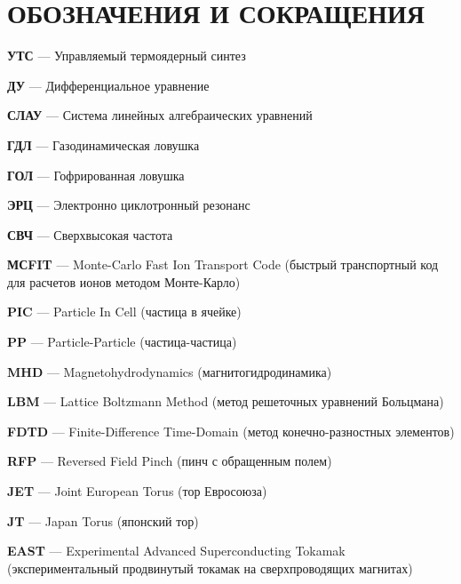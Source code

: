 \chapter*{ОБОЗНАЧЕНИЯ  И СОКРАЩЕНИЯ}             %

\textbf{УТС} --- Управляемый термоядерный синтез

\textbf{ДУ} --- Дифференциальное уравнение

\textbf{СЛАУ} --- Система линейных алгебраических уравнений

\textbf{ГДЛ} --- Газодинамическая ловушка

\textbf{ГОЛ} --- Гофрированная ловушка

\textbf{ЭРЦ} --- Электронно циклотронный резонанс

\textbf{СВЧ} --- Сверхвысокая частота

\textbf{МСFIT} --- Monte-Carlo Fast Ion Transport Code (быстрый транспортный код для расчетов ионов методом Монте-Карло)

\textbf{PIC} --- Particle In Cell (частица в ячейке)

\textbf{PP} --- Particle-Particle (частица-частица)

\textbf{MHD} --- Magnetohydrodynamics (магнитогидродинамика)

\textbf{LBM} --- Lattice Boltzmann Method (метод решеточных уравнений Больцмана)

\textbf{FDTD} --- Finite-Difference Time-Domain (метод конечно-разностных элементов)

\textbf{RFP} --- Reversed Field Pinch (пинч с обращенным полем)

\textbf{JET} --- Joint European Torus (тор Евросоюза)

\textbf{JT} --- Japan Torus (японский тор)

\textbf{EAST} --- Experimental Advanced Superconducting Tokamak (экспериментальный продвинутый токамак на сверхпроводящих магнитах)